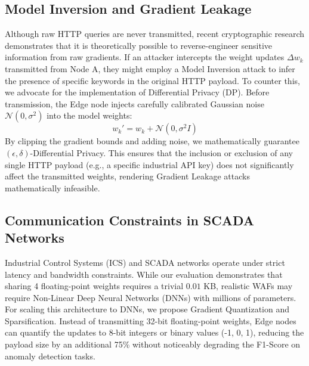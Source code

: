 \documentclass[conference]{IEEEtran}
\begin{document}
\subsection{Model Inversion and Gradient Leakage}
Although raw HTTP queries are never transmitted, recent cryptographic research demonstrates that it is theoretically possible to reverse-engineer sensitive information from raw gradients. If an attacker intercepts the weight updates $\Delta w_k$ transmitted from Node A, they might employ a Model Inversion attack to infer the presence of specific keywords in the original HTTP payload.
To counter this, we advocate for the implementation of Differential Privacy (DP). Before transmission, the Edge node injects carefully calibrated Gaussian noise $\mathcal{N}(0, \sigma^2)$ into the model weights:
\begin{equation}
    w_k' = w_k + \mathcal{N}(0, \sigma^2 I)
\end{equation}
By clipping the gradient bounds and adding noise, we mathematically guarantee $(\epsilon, \delta)$-Differential Privacy. This ensures that the inclusion or exclusion of any single HTTP payload (e.g., a specific industrial API key) does not significantly affect the transmitted weights, rendering Gradient Leakage attacks mathematically infeasible.

\subsection{Communication Constraints in SCADA Networks}
Industrial Control Systems (ICS) and SCADA networks operate under strict latency and bandwidth constraints. While our evaluation demonstrates that sharing 4 floating-point weights requires a trivial $0.01$ KB, realistic WAFs may require Non-Linear Deep Neural Networks (DNNs) with millions of parameters.
For scaling this architecture to DNNs, we propose Gradient Quantization and Sparsification. Instead of transmitting 32-bit floating-point weights, Edge nodes can quantify the updates to 8-bit integers or binary values (-1, 0, 1), reducing the payload size by an additional 75\% without noticeably degrading the F1-Score on anomaly detection tasks.
\end{document}
